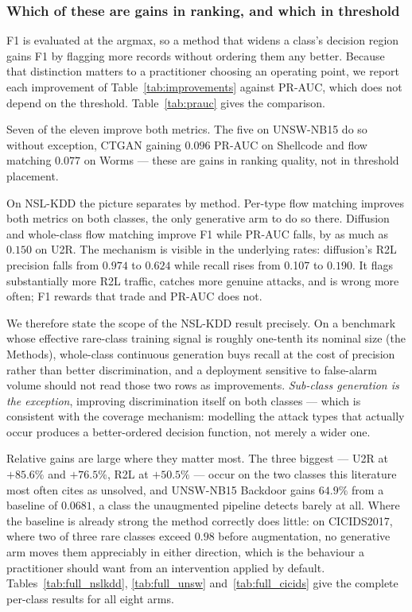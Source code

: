 \documentclass[11pt]{article}
\newcommand{\baseRtwolRec}{0.107}     %
\begin{document}
\subsubsection*{Which of these are gains in ranking, and which in threshold}

F1 is evaluated at the argmax, so a method that widens a class's decision region
gains F1 by flagging more records without ordering them any better. Because that
distinction matters to a practitioner choosing an operating point, we report each
improvement of Table~\ref{tab:improvements} against PR-AUC, which does not depend on
the threshold. Table~\ref{tab:prauc} gives the comparison.

Seven of the eleven improve both metrics. The five on UNSW-NB15 do so without
exception, CTGAN gaining $0.096$ PR-AUC on Shellcode and flow matching $0.077$ on
Worms --- these are gains in ranking quality, not in threshold placement.

On NSL-KDD the picture separates by method. Per-type flow matching improves both
metrics on both classes, the only generative arm to do so there. Diffusion and
whole-class flow matching improve F1 while PR-AUC falls, by as much as $0.150$ on
U2R. The mechanism is visible in the underlying rates: diffusion's R2L precision
falls from $0.974$ to $0.624$ while recall rises from \baseRtwolRec{} to $0.190$. It
flags substantially more R2L traffic, catches more genuine attacks, and is wrong more
often; F1 rewards that trade and PR-AUC does not.

We therefore state the scope of the NSL-KDD result precisely. On a benchmark whose
effective rare-class training signal is roughly one-tenth its nominal size
(the Methods), whole-class continuous generation buys recall at the
cost of precision rather than better discrimination, and a deployment sensitive to
false-alarm volume should not read those two rows as improvements.
\emph{Sub-class generation is the exception}, improving discrimination itself on both
classes --- which is consistent with the coverage mechanism: modelling the attack types that actually occur
produces a better-ordered decision function, not merely a wider one.



Relative gains are large where they matter most. The three biggest --- U2R at
$+85.6\%$ and $+76.5\%$, R2L at $+50.5\%$ --- occur on the two classes this
literature most often cites as unsolved, and UNSW-NB15 Backdoor gains $64.9\%$ from
a baseline of $0.0681$, a class the unaugmented pipeline detects barely at all.
Where the baseline is already strong the method correctly does little: on
CICIDS2017, where two of three rare classes exceed $0.98$ before augmentation, no
generative arm moves them appreciably in either direction, which is the behaviour a
practitioner should want from an intervention applied by default. Tables~\ref{tab:full_nslkdd},
\ref{tab:full_unsw} and~\ref{tab:full_cicids} give the complete per-class results
for all eight arms.
\end{document}
